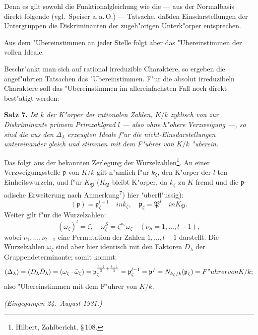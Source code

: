 \documentclass[12pt,a4paper]{article}
\theoremstyle{plain}
\begin{document}
Denn es gilt sowohl die Funktionalgleichung wie die --- aus der Normalbasis direkt folgende (vgl.\ Speiser a.\,a.\,O.) --- Tatsache, da\ss den Einsdarstellungen der Untergruppen die Diskriminanten der zugeh"origen Unterk"orper entsprechen.

Aus dem "Ubereinstimmen an jeder Stelle folgt aber das "Ubereinstimmen der vollen Ideale.

Beschr"ankt man sich auf rational irreduzible Charaktere, so ergeben die angef"uhrten Tatsachen das "Ubereinstimmen. F"ur die absolut irreduzibeln Charaktere soll das "Ubereinstimmen im allereinfachsten Fall noch direkt best"atigt werden:

\medskip\noindent\textbf{Satz 7.}
\textit{Ist $k$ der K"orper der rationalen Zahlen, $K/k$ zyklisch von zur Diskriminante primem Primzahlgrad $l$ --- also ohne h"ohere Verzweigung ---, so sind die aus den $\Delta_\lambda$ erzeugten Ideale f"ur die nicht-Einsdarstellungen untereinander gleich und stimmen mit dem F"uhrer von $K/k$ "uberein.}

Das folgt aus der bekannten Zerlegung der Wurzelzahlen\footnote{Hilbert, Zahlbericht, \S\,108.}. An einer Verzweigungsstelle $\mathfrak{p}$ von $K/k$ gilt n"amlich f"ur $k_\zeta$, den K"orper der $l$-ten Einheitswurzeln, und f"ur $K_\mathfrak{P}$ ($K_\mathfrak{P}$ bleibt K"orper, da $k_\zeta$ zu $K$ fremd und die $\mathfrak{p}$-adische Erweiterung nach Anmerkung\textsuperscript{7}) hier "uberfl"ussig):
\[
(\mathfrak{p}) = \mathfrak{p}_\zeta^{l-1}\quad{in } k_\zeta,\quad
\mathfrak{p}_\zeta = \mathfrak{P}^l\quad{in } K_\mathfrak{P}.
\]
Weiter gilt f"ur die Wurzelzahlen:
\[
(\omega_\zeta)^l = \zeta,\quad
\omega_\zeta^S = \zeta^{\nu_S} \omega_\zeta\quad (\nu_S = 1,\ldots,l-1),
\]
wobei $\nu_1,\ldots,\nu_{l-1}$ eine Permutation der Zahlen $1,\ldots,l-1$ darstellt. Die Wurzelzahlen $\omega_\zeta$ sind aber hier identisch mit den Faktoren $D_\lambda$ der Gruppendeterminante; somit kommt:
\[
(\Delta_\lambda) = (D_\lambda \bar{D}_\lambda) = (\omega_\zeta \cdot \bar{\omega}_\zeta) = \mathfrak{p}_\zeta^{\frac{l-1}{2} + \frac{l-1}{2}} = \mathfrak{p}_\zeta^{l-1} = \mathfrak{p}^f = N_{k_\zeta/k}(\mathfrak{p}_\zeta) = {F"uhrer von } K/k;
\]
also "Ubereinstimmen mit dem F"uhrer von $K/k$.

\medskip
\hfill\textit{(Eingegangen 24.\ August 1931.)}

\end{document}
